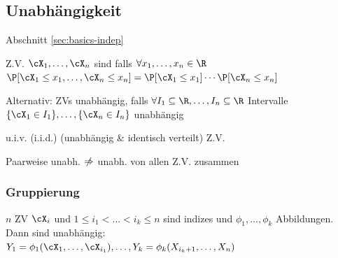 \subsection{Unabhängigkeit}
\label{sec:rv-indep}
 Abschnitt \ref{sec:basics-indep}

\shortdefinition Z.V. $\cX_1, \ldots, \cX_n$ sind  falls
$\forall x_1, \ldots, x_n \in \R$ $\P[\cX_1 \leq x_1, \ldots, \cX_n \leq x_n] = \P[\cX_1 \leq x_1] \cdots \P[\cX_n \leq x_n]$

\shortremark Alternativ: ZVs unabhängig, falls $\forall I_1 \subseteq \R, \ldots, I_n \subseteq \R$ Intervalle
$\{ \cX_1 \in I_1 \}, \ldots, \{ \cX_n \in I_n \}$ unabhängig

\shortdefinition u.i.v. (i.i.d.) (unabhängig \& identisch verteilt) Z.V.

\shortremark Paarweise unabh. $\centernot{\Rightarrow}$ unabh. von allen Z.V. zusammen

\subsubsection{Gruppierung}
\shorttheorem $n$ ZV $\cX_i$ und $1 \leq i_1 < \ldots < i_k \leq n$ sind indizes und $\phi_1, \ldots, \phi_k$ Abbildungen. Dann sind unabhängig:\\
$Y_1 = \phi_1(\cX_1, \ldots, \cX_{i_1}), \ldots, Y_k = \phi_k(X_{i_k + 1}, \ldots, X_n)$
